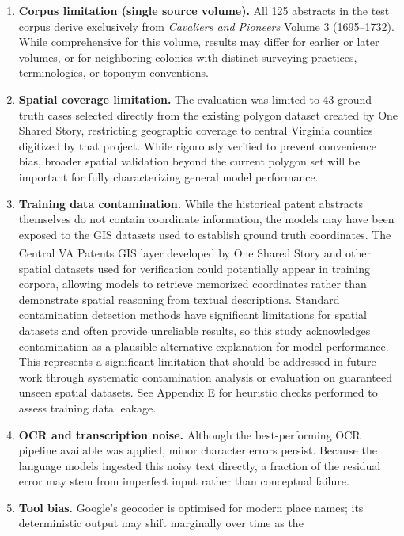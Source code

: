 \documentclass[
  10pt,
  twocolumn]{article}
\begin{document}
\begin{enumerate}
\def\labelenumi{\arabic{enumi}.}
\item
  \textbf{Corpus limitation (single source volume).} All 125 abstracts
  in the test corpus derive exclusively from \emph{Cavaliers and
  Pioneers} Volume 3 (1695--1732). While comprehensive for this volume,
  results may differ for earlier or later volumes, or for neighboring
  colonies with distinct surveying practices, terminologies, or toponym
  conventions.
\item
  \textbf{Spatial coverage limitation.} The evaluation was limited to 43
  ground-truth cases selected directly from the existing polygon dataset
  created by One Shared Story, restricting geographic coverage to
  central Virginia counties digitized by that project. While rigorously
  verified to prevent convenience bias, broader spatial validation
  beyond the current polygon set will be important for fully
  characterizing general model performance.
\item
  \textbf{Training data contamination.} While the historical patent
  abstracts themselves do not contain coordinate information, the models
  may have been exposed to the GIS datasets used to establish ground
  truth coordinates. The Central VA Patents GIS layer developed by One
  Shared
  Story\textsuperscript{} and
  other spatial datasets used for verification could potentially appear
  in training corpora, allowing models to retrieve memorized coordinates
  rather than demonstrate spatial reasoning from textual descriptions.
  Standard contamination detection methods have significant limitations
  for spatial datasets and often provide unreliable results, so this
  study acknowledges contamination as a plausible alternative
  explanation for model performance. This represents a significant
  limitation that should be addressed in future work through systematic
  contamination analysis or evaluation on guaranteed unseen spatial
  datasets. See Appendix E for heuristic checks performed to assess
  training data leakage.
\item
  \textbf{OCR and transcription noise.} Although the best-performing OCR
  pipeline available was applied, minor character errors persist.
  Because the language models ingested this noisy text directly, a
  fraction of the residual error may stem from imperfect input rather
  than conceptual failure.
\item
  \textbf{Tool bias.} Google's geocoder is optimised for modern place
  names; its deterministic output may shift marginally over time as the

\end{enumerate}
\end{document}
